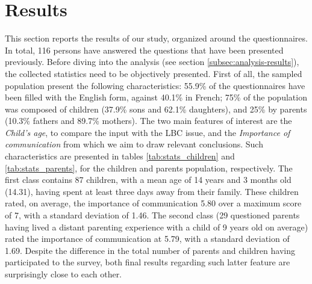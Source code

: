 \section{Results}
\label{sec:results}

This section reports the results of our study, organized around the questionnaires. In total, 116 persons have answered the questions that have been presented previously. Before diving into the analysis (see section \ref{subsec:analysis-results}), the collected statistics need to be objectively presented. First of all, the sampled population present the following characteristics:  55.9\% of the questionnaires have been filled with the English form, against 40.1\% in French; 75\% of the population was composed of children (37.9\% sons and 62.1\% daughters), and 25\% by parents (10.3\% fathers and 89.7\% mothers). The two main features of interest are the \textit{Child's age}, to compare the input with the LBC issue, and the \textit{Importance of communication} from which we aim to draw relevant conclusions. Such characteristics are presented in tables \ref{tab:stats_children} and \ref{tab:stats_parents}, for the children and parents population, respectively. The first class contains 87 children, with a mean age of 14 years and 3 months old (14.31), having spent at least three days away from their family. These children rated, on average, the importance of communication 5.80 over a maximum score of 7, with a standard deviation of 1.46. The second class (29 questioned parents having lived a distant parenting experience with a child of 9 years old on average) rated the importance of communication at 5.79, with a standard deviation of 1.69. Despite the difference in the total number of parents and children having participated to the survey, both final results regarding such latter feature are surprisingly close to each other.



